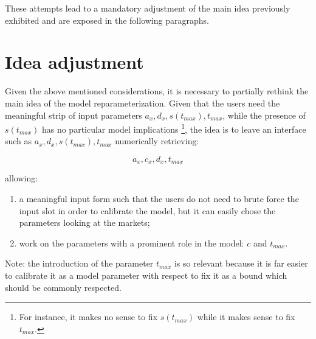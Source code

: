 These attempts lead to a mandatory adjustment of the main idea previously exhibited and are exposed in the following paragraphs.

\section{Idea adjustment}


Given the above mentioned considerations, it is necessary to partially rethink the main idea of the model reparameterization. Given that the users need the meaningful strip of input parameters $a_{x}, d_{x}, s(t_{max}), t_{max}$, while the presence of $s(t_{max})$ has no particular model implications \footnote{For instance, it makes no sense to fix $s(t_{max})$ while it makes sense to fix $t_{max}$.}, the idea is to leave an interface such as $a_{x}, d_{x}, s(t_{max}), t_{max}$ numerically retrieving:

\begin{equation}
    a_{x}, c_{x}, d_{x}, t_{max}
    \label{eq:new parameters}
\end{equation}

allowing:

\begin{enumerate}
    \item a meaningful input form such that the users do not need to brute force the input slot in order to calibrate the model, but it can easily chose the parameters looking at the markets;
    \item work on the parameters with a prominent role in the model: $c$ and $t_{max}$.
\end{enumerate}

Note: the introduction of the parameter $t_{max}$ is so relevant because it is far easier to calibrate it as a model parameter with respect to fix it as a bound which should be commonly respected.


